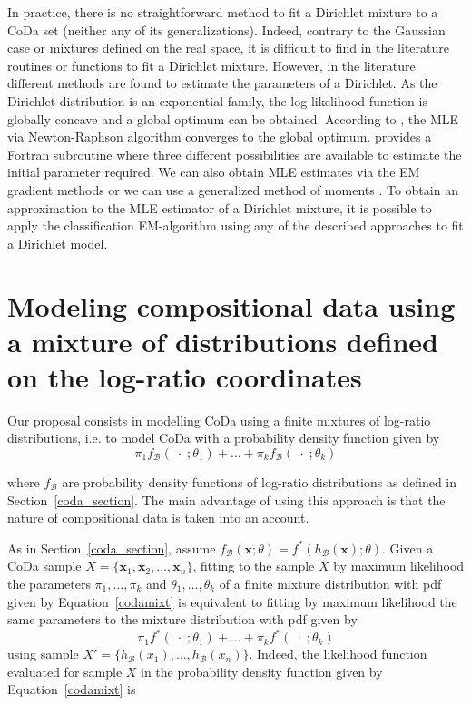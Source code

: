 \documentclass[10pt, a4paper]{article}
\begin{document}
In practice, there is no straightforward method to fit a Dirichlet mixture to a CoDa set (neither any of its generalizations). Indeed, contrary to the Gaussian case or mixtures defined on the real space, it is difficult to find in the literature routines or functions to fit a Dirichlet mixture. However, in the literature different methods are found to estimate the parameters of a Dirichlet. As the Dirichlet distribution is an exponential family, the log-likelihood function is globally concave and a global optimum can be obtained. According to \cite{ng2011dirichlet}, the MLE via Newton-Raphson algorithm converges to the global optimum. \cite{narayanan1991algorithm} provides a Fortran subroutine where three different possibilities are available to estimate the initial parameter required.
We can also obtain MLE estimates via the EM gradient methods \citep{ng2011dirichlet} or we can use a generalized method of moments
\citep{hansen1982large}.  
To obtain an approximation to the MLE estimator of a Dirichlet mixture, it is possible to apply the classification EM-algorithm \citep[CEM algorithm,][]{celeux1992classification} using any of the described approaches to fit a Dirichlet model.



\section{Modeling compositional data using a mixture of distributions defined on the log-ratio coordinates}
\label{codamix_section}

\noindent Our proposal consists in modelling CoDa using a finite mixtures of log-ratio distributions, i.e. to model CoDa with a probability density function given by 
\begin{equation}
\pi_1 f_\mathcal{B}(\;\cdot\; ; \theta_1) + \dots + \pi_k f_\mathcal{B}(\;\cdot\; ; \theta_k)
\label{codamixt}
\end{equation}

where $f_\mathcal{B}$ are probability density functions of log-ratio distributions as defined in Section~\ref{coda_section}. The main advantage of using this approach is that the nature of compositional data is taken into an account.

As in Section~\ref{coda_section}, assume $f_\mathcal{B}(\textbf{x} ; \theta) = f^*(h_\mathcal{B}(\textbf{x}) ; \theta)$. Given a CoDa sample $X =  \{ \textbf{x}_1, \textbf{x}_2, \dots , \textbf{x}_n \}$, fitting to the sample $X$ by maximum likelihood the parameters $\pi_1, \dots, \pi_k$ and $\theta_1, \dots, \theta_k$ of a finite mixture distribution with pdf given by Equation~\ref{codamixt} is equivalent to fitting by maximum likelihood the same parameters to the mixture distribution with pdf given by
\begin{equation}
\pi_1 f^*(\;\cdot\; ; \theta_1) + \dots + \pi_k f^*(\;\cdot\; ; \theta_k)
\label{coordmixt}
\end{equation}
using sample $X' = \{ h_\mathcal{B}(x_1), \dots, h_\mathcal{B}(x_n) \}$. Indeed, the likelihood function evaluated for sample $X$ in the probability density function given by Equation~\ref{codamixt} is
\end{document}
